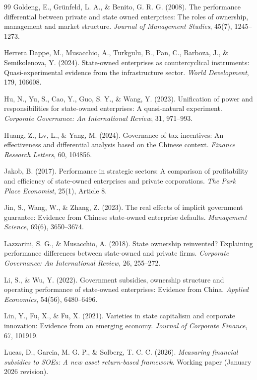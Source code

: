 \documentclass[11pt,a4paper]{ctexart}
\begin{document}
\begin{thebibliography}{99}
 Goldeng, E., Grünfeld, L. A., \& Benito, G. R. G. (2008). The performance differential between private and state owned enterprises: The roles of ownership, management and market structure. \emph{Journal of Management Studies}, 45(7), 1245--1273.

 Herrera Dappe, M., Musacchio, A., Turkgulu, B., Pan, C., Barboza, J., \& Semikolenova, Y. (2024). State-owned enterprises as countercyclical instruments: Quasi-experimental evidence from the infrastructure sector. \emph{World Development}, 179, 106608.

 Hu, N., Yu, S., Cao, Y., Guo, S. Y., \& Wang, Y. (2023). Unification of power and responsibilities for state-owned enterprises: A quasi-natural experiment. \emph{Corporate Governance: An International Review}, 31, 971--993.

 Huang, Z., Lv, L., \& Yang, M. (2024). Governance of tax incentives: An effectiveness and differential analysis based on the Chinese context. \emph{Finance Research Letters}, 60, 104856.

 Jakob, B. (2017). Performance in strategic sectors: A comparison of profitability and efficiency of state-owned enterprises and private corporations. \emph{The Park Place Economist}, 25(1), Article 8.

 Jin, S., Wang, W., \& Zhang, Z. (2023). The real effects of implicit government guarantee: Evidence from Chinese state-owned enterprise defaults. \emph{Management Science}, 69(6), 3650--3674.

 Lazzarini, S. G., \& Musacchio, A. (2018). State ownership reinvented? Explaining performance differences between state-owned and private firms. \emph{Corporate Governance: An International Review}, 26, 255--272.

 Li, S., \& Wu, Y. (2022). Government subsidies, ownership structure and operating performance of state-owned enterprises: Evidence from China. \emph{Applied Economics}, 54(56), 6480--6496.

 Lin, Y., Fu, X., \& Fu, X. (2021). Varieties in state capitalism and corporate innovation: Evidence from an emerging economy. \emph{Journal of Corporate Finance}, 67, 101919.

 Lucas, D., Garcia, M. G. P., \& Solberg, T. C. C. (2026). \emph{Measuring financial subsidies to SOEs: A new asset return-based framework}. Working paper (January 2026 revision).


\end{thebibliography}
\end{document}
